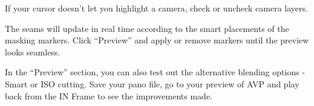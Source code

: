 \begin{fullwidth}
\tip If your cursor doesn’t let you highlight a camera, check or uncheck camera layers.


The seams will update in real time according to the smart placements of the masking markers. Click “Preview” and apply or remove markers until the preview looks seamless.



In the “Preview” section, you can also test out the alternative blending options - Smart or ISO cutting. Save your pano file, go to your preview of AVP and play back from the IN Frame to see the improvements made.


\clearpage
\end{fullwidth}